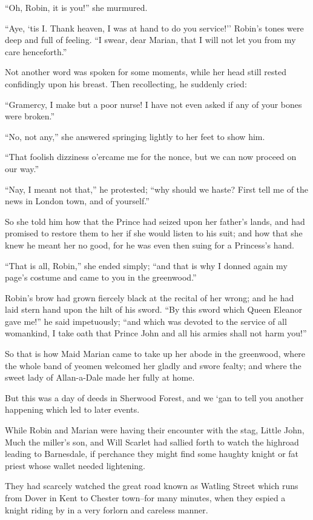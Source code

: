 ``Oh, Robin, it is you!'' she murmured.

``Aye, `tis I. Thank heaven, I was at hand to do you service!'' Robin's
tones were deep and full of feeling. ``I swear, dear Marian, that I will
not let you from my care henceforth.''

Not another word was spoken for some moments, while her head still
rested confidingly upon his breast. Then recollecting, he suddenly
cried:

``Gramercy, I make but a poor nurse! I have not even asked if any of
your bones were broken.''

``No, not any,'' she answered springing lightly to her feet to show him.

``That foolish dizziness o'ercame me for the nonce, but we can now
proceed on our way.''

``Nay, I meant not that,'' he protested; ``why should we haste? First
tell me of the news in London town, and of yourself.''

So she told him how that the Prince had seized upon her father's lands,
and had promised to restore them to her if she would listen to his suit;
and how that she knew he meant her no good, for he was even then suing
for a Princess's hand.

``That is all, Robin,'' she ended simply; ``and that is why I donned
again my page's costume and came to you in the greenwood.''

Robin's brow had grown fiercely black at the recital of her wrong; and
he had laid stern hand upon the hilt of his sword. ``By this sword which
Queen Eleanor gave me!'' he said impetuously; ``and which was devoted to
the service of all womankind, I take oath that Prince John and all his
armies shall not harm you!''

So that is how Maid Marian came to take up her abode in the greenwood,
where the whole band of yeomen welcomed her gladly and swore fealty; and
where the sweet lady of Allan-a-Dale made her fully at home.

But this was a day of deeds in Sherwood Forest, and we `gan to tell you
another happening which led to later events.

While Robin and Marian were having their encounter with the stag, Little
John, Much the miller's son, and Will Scarlet had sallied forth to watch
the highroad leading to Barnesdale, if perchance they might find some
haughty knight or fat priest whose wallet needed lightening.

They had scarcely watched the great road known as Watling Street which
runs from Dover in Kent to Chester town--for many minutes, when they
espied a knight riding by in a very forlorn and careless manner.

